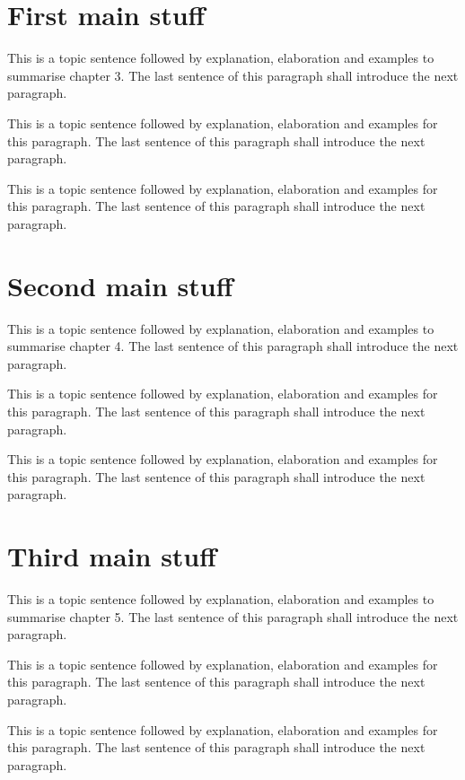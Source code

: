 \section{First main stuff}
\label{sec:ch_8_firstmain}

This is a topic sentence followed by explanation, elaboration and examples to summarise chapter 3. The last sentence of this paragraph shall introduce the next paragraph. \lipsum[1]

This is a topic sentence followed by explanation, elaboration and examples for this paragraph. The last sentence of this paragraph shall introduce the next paragraph. \lipsum[1]

This is a topic sentence followed by explanation, elaboration and examples for this paragraph. The last sentence of this paragraph shall introduce the next paragraph. \lipsum[1]

\section{Second main stuff}
\label{sec:ch_8_secondmain}

This is a topic sentence followed by explanation, elaboration and examples to summarise chapter 4. The last sentence of this paragraph shall introduce the next paragraph. \lipsum[1]

This is a topic sentence followed by explanation, elaboration and examples for this paragraph. The last sentence of this paragraph shall introduce the next paragraph. \lipsum[1]

This is a topic sentence followed by explanation, elaboration and examples for this paragraph. The last sentence of this paragraph shall introduce the next paragraph. \lipsum[1]

\section{Third main stuff}
\label{sec:ch_8_thirdmain}

This is a topic sentence followed by explanation, elaboration and examples to summarise chapter 5. The last sentence of this paragraph shall introduce the next paragraph. \lipsum[1]

This is a topic sentence followed by explanation, elaboration and examples for this paragraph. The last sentence of this paragraph shall introduce the next paragraph. \lipsum[1]

This is a topic sentence followed by explanation, elaboration and examples for this paragraph. The last sentence of this paragraph shall introduce the next paragraph. \lipsum[1]

